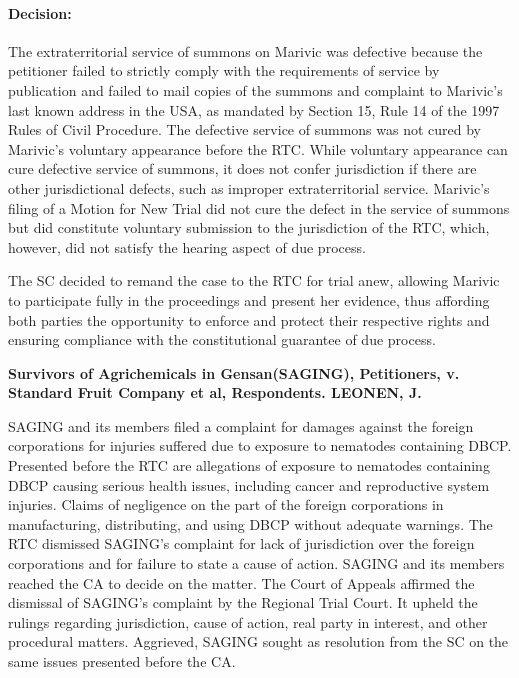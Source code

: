 \documentclass[
12pt,
oneside,
onehalfspacing,
headsepline
]{DigestCollection}
\begin{document}
\paragraph{Decision:}


The extraterritorial service of summons on Marivic was defective because the petitioner failed to strictly comply with the requirements of service by publication and failed to mail copies of the summons and complaint to Marivic's last known address in the USA, as mandated by Section 15, Rule 14 of the 1997 Rules of Civil Procedure. The defective service of summons was not cured by Marivic's voluntary appearance before the RTC. While voluntary appearance can cure defective service of summons, it does not confer jurisdiction if there are other jurisdictional defects, such as improper extraterritorial service. Marivic's filing of a Motion for New Trial did not cure the defect in the service of summons but did constitute voluntary submission to the jurisdiction of the RTC, which, however, did not satisfy the hearing aspect of due process.

The SC decided to remand the case to the RTC for trial anew, allowing Marivic to participate fully in the proceedings and present her evidence, thus affording both parties the opportunity to enforce and protect their respective rights and ensuring compliance with the constitutional guarantee of due process.


\noindent\textbf{Survivors of Agrichemicals in Gensan(SAGING), Petitioners, v. \\Standard Fruit Company et al, Respondents. LEONEN, J.}\vspace{0.4cm}

SAGING and its members filed a complaint for damages against the foreign corporations for injuries suffered due to exposure to nematodes containing DBCP. Presented before the RTC are allegations of exposure to nematodes containing DBCP causing serious health issues, including cancer and reproductive system injuries. Claims of negligence on the part of the foreign corporations in manufacturing, distributing, and using DBCP without adequate warnings. The RTC dismissed SAGING's complaint for lack of jurisdiction over the foreign corporations and for failure to state a cause of action. SAGING and its members reached the CA to decide on the matter. The Court of Appeals affirmed the dismissal of SAGING's complaint by the Regional Trial Court. It upheld the rulings regarding jurisdiction, cause of action, real party in interest, and other procedural matters. Aggrieved, SAGING sought as resolution from the SC on the same issues presented before the CA.
\end{document}
